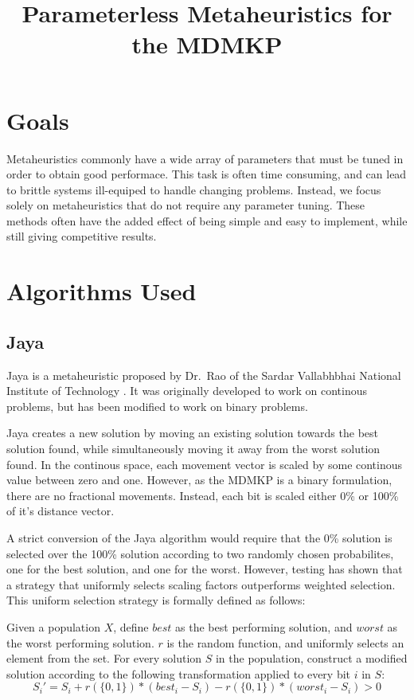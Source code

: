 \documentclass[11pt, letterpaper, onecolumn]{article}
\title{\textbf{Parameterless Metaheuristics for the MDMKP}}
\begin{document}
\maketitle

\section{Goals}

Metaheuristics commonly have a wide array of parameters that must be tuned in order to
obtain good performace. This task is often time consuming, and can lead to brittle systems
ill-equiped to handle changing problems. Instead, we focus solely on metaheuristics that
do not require any parameter tuning. These methods often have the added effect of being
simple and easy to implement, while still giving competitive results.

\section{Algorithms Used}

\subsection{Jaya}

Jaya is a metaheuristic proposed by Dr.~Rao of the Sardar Vallabhbhai National
Institute of Technology%
. It was originally developed to work on continous
problems, but has been modified to work on binary problems.

Jaya creates a new solution by moving an existing solution towards the best solution found, while simultaneously moving it away from the worst solution found. In the continous space, each movement vector is scaled by some continous value between zero and one. However, as the MDMKP is a binary formulation, there are no fractional movements. Instead, each bit is scaled either 0\% or 100\% of it's distance vector. 

A strict conversion of the Jaya algorithm would require that the 0\% solution is selected over the 100\% solution according to two randomly chosen probabilites, one for the best solution, and one for the worst. However, testing has shown that a strategy that uniformly selects scaling factors outperforms weighted selection. This uniform selection strategy is formally defined as follows: 

 Given a population $X$, define $best$ as the best performing solution, and $worst$ as the worst performing solution. $r$ is the random function, and uniformly selects an element from the set. For every solution $S$ in the population, construct a modified solution according to the following transformation applied to every bit $i$ in $S$:
\begin{equation} S_i' = S_i + r(\{0, 1\})*(best_i - S_i) - r(\{0, 1\})*(worst_i - S_i) > 0 \end{equation}
\end{document}
